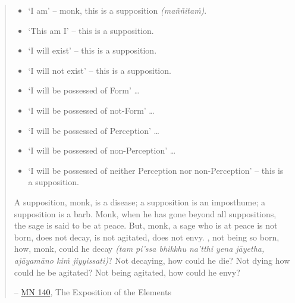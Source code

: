 \begin{quote}
\begin{itemize}
\item
  `I am' -- monk, this is a supposition \emph{(maññitaṁ)}.
\item
  `This am I' -- this is a supposition.
\item
  `I will exist' -- this is a supposition.
\item
  `I will not exist' -- this is a supposition.
\item
  `I will be possessed of Form' \ldots\hspace{0pt}
\item
  `I will be possessed of not-Form' \ldots\hspace{0pt}
\item
  `I will be possessed of Perception' \ldots\hspace{0pt}
\item
  `I will be possessed of non-Perception' \ldots\hspace{0pt}
\item
  `I will be possessed of neither Perception nor non-Perception' -- this is a supposition.
\end{itemize}

A supposition, monk, is a disease; a supposition is an imposthume; a supposition is a barb. Monk, when he has gone beyond all suppositions, the sage is said to be at peace. But, monk, a sage who is at peace is not born, does not decay, is not agitated, does not envy. , not being so born, how, monk, could he decay \emph{(tam pi'ssa bhikkhu na'tthi yena jāyetha, ajāyamāno kiṁ jiyyissati)}? Not decaying, how could he die? Not dying how could he be agitated? Not being agitated, how could he envy?

 -- \href{https://suttacentral.net/mn140/en/bodhi}{MN 140}, The Exposition of the Elements
\end{quote}

